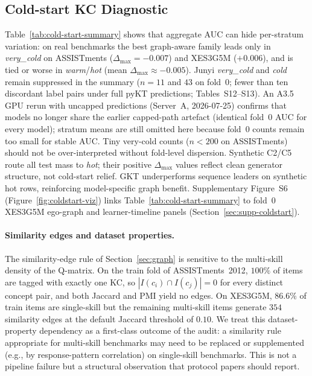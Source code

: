 \documentclass[pdflatex,sn-mathphys-num]{sn-jnl}
\begin{document}
\subsection{Cold-start KC Diagnostic}
\label{sec:exp-coldstart}

Table~\ref{tab:cold-start-summary} shows that aggregate AUC can hide
per-stratum variation: on real benchmarks the best graph-aware family
leads only in \emph{very\_cold} on ASSISTments ($\Delta_{\max}{=}{-}0.007$)
and XES3G5M ($+0.006$), and is tied or worse in \emph{warm}/\emph{hot}
(mean $\Delta_{\max}{\approx}{-}0.005$). Junyi \emph{very\_cold} and \emph{cold}
remain suppressed in the summary ($n{=}11$ and $43$ on fold~0; fewer than ten
discordant label pairs under full pyKT predictions; Tables~S12--S13). An A3.5
GPU rerun with uncapped predictions (Server~A, 2026-07-25) confirms that models
no longer share the earlier capped-path artefact (identical fold~0 AUC for every
model); stratum means are still omitted here because fold~0 counts remain too
small for stable AUC. Tiny very-cold counts
($n{<}200$ on ASSISTments) should not be over-interpreted without
fold-level dispersion. Synthetic C2/C5 route
all test mass to \emph{hot}; their positive $\Delta_{\max}$ values
reflect clean generator structure, not cold-start relief. GKT underperforms
sequence leaders on synthetic hot rows, reinforcing model-specific graph benefit.
Supplementary Figure~S6 (Figure~\ref{fig:coldstart-viz}) links
Table~\ref{tab:cold-start-summary} to fold~0 XES3G5M ego-graph and
learner-timeline panels (Section~\ref{sec:supp-coldstart}).

\paragraph{Similarity edges and dataset properties.}
The similarity-edge rule of Section~\ref{sec:graph} is sensitive to the
multi-skill density of the Q-matrix. On the train fold of
ASSISTments~2012, $100\%$ of items are tagged with exactly one KC, so
$|I(c_i) \cap I(c_j)| = 0$ for every distinct concept pair, and both
Jaccard and PMI yield no edges. On XES3G5M, $86.6\%$ of train items are
single-skill but the remaining multi-skill items generate $354$
similarity edges at the default Jaccard threshold of $0.10$. We treat
this dataset-property dependency as a first-class outcome of the audit:
a similarity rule appropriate for multi-skill benchmarks may need to be
replaced or supplemented (e.g., by response-pattern correlation) on
single-skill benchmarks. This is not a pipeline failure but a structural
observation that protocol papers should report.
\end{document}
